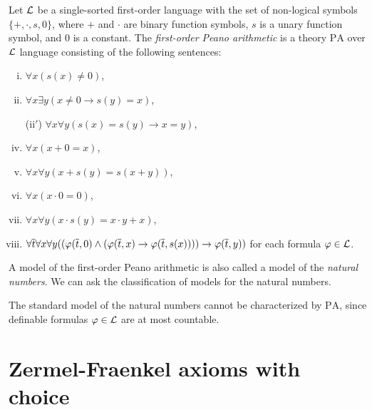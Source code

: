 \documentclass{../../large}
\begin{document}
\begin{prb}
Let $\mathcal{L}$ be a single-sorted first-order language with the set of non-logical symbols $\{+,\cdot,s,0\}$, where $+$ and $\cdot$ are binary function symbols, $s$ is a unary function symbol, and $0$ is a constant.
The \emph{first-order Peano arithmetic} is a theory $\mathrm{PA}$ over $\mathcal{L}$ language consisting of the following sentences:
\begin{enumerate}[(i)]
\item $\forall x(s(x)\ne0)$,
\item $\forall x\exists y(x\ne0\to s(y)=x)$,
\item[(ii$'$)] $\forall x\forall y(s(x)=s(y)\to x=y)$,
\item $\forall x(x+0=x)$,
\item $\forall x\forall y(x+s(y)=s(x+y))$,
\item $\forall x(x\cdot0=0)$,
\item $\forall x\forall y(x\cdot s(y)=x\cdot y+x)$,
\item $\forall\overline t\forall x\forall y((\varphi(\overline t,0)\wedge(\varphi(\overline t,x)\to\varphi(\overline t,s(x))))\to\varphi(\overline t,y))$ for each formula $\varphi\in\mathcal{L}$.
\end{enumerate}
A model of the first-order Peano arithmetic is also called a model of the \emph{natural numbers}.
We can ask the classification of models for the natural numbers.

The standard model of the natural numbers cannot be characterized by $\mathrm{PA}$, since definable formulas $\varphi\in\mathcal{L}$ are at most countable.

\end{prb}



\section{Zermel-Fraenkel axioms with choice}
\end{document}
